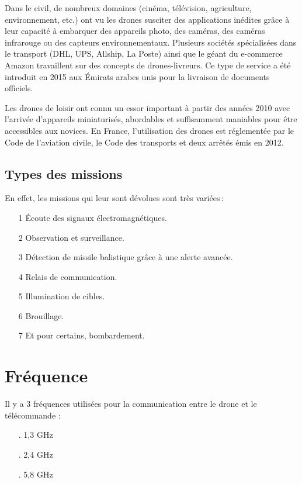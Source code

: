 Dans le civil, de nombreux domaines (cinéma, télévision, agriculture, environnement, etc.) ont vu les drones susciter des applications inédites grâce à leur capacité à embarquer des appareils photo, des caméras, des caméras infrarouge ou des capteurs environnementaux. Plusieurs sociétés spécialisées dans le transport (DHL, UPS, Allship, La Poste) ainsi que le géant du e-commerce Amazon travaillent sur des concepts de drones-livreurs. Ce type de service a été introduit en 2015 aux Émirats arabes unis pour la livraison de documents officiels.  

Les drones de loisir ont connu un essor important à partir des années 2010 avec l’arrivée d’appareils miniaturisés, abordables et suffisamment maniables pour être accessibles aux novices. En France, l'utilisation des drones est réglementée par le Code de l’aviation civile, le Code des transports et deux arrêtés émis en 2012. 


 

 \subsection{Types des missions}

 
En effet, les missions qui leur sont dévolues sont très variées :  

\begin{itemize}
\item[1] Écoute des signaux électromagnétiques.
\item[2]    Observation et surveillance. 
\item[3]    Détection de missile balistique grâce à une alerte avancée. 
\item[4]    Relais de communication. 
\item[5]    Illumination de cibles. 
\item[6]    Brouillage. 
\item[7]     Et pour certains, bombardement. 
\end{itemize}
     

\section{Fréquence}

Il y a 3 fréquences utilisées pour la communication entre le drone et le télécommande : 
\begin{itemize}
\item[.] 1,3 GHz
\item[.]    2,4 GHz 
\item[.]    5,8 GHz 
\end{itemize}
     





